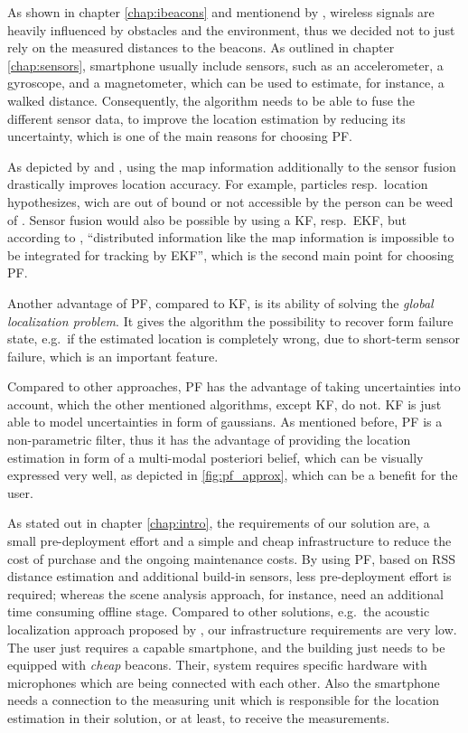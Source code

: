 As shown in chapter \ref{chap:ibeacons} and mentionend by \citet{IEEE:survey_wireless_indoor_pos}, wireless signals are heavily influenced by obstacles and the environment, thus we decided not to just rely on the measured distances to the beacons. As outlined in chapter \ref{chap:sensors}, smartphone usually include sensors, such as an accelerometer, a gyroscope, and a magnetometer, which can be used to estimate, for instance, a walked distance. Consequently, the algorithm needs to be able to fuse the different sensor data, to improve the location estimation by reducing its uncertainty, which is one of the main reasons for choosing \acs{PF}.

As depicted by \citet{siddiqi:experiments_mcl_wifi} and \citet{wang:wlan}, using the map information additionally to the sensor fusion drastically improves location accuracy. For example, particles resp.\ location hypothesizes, wich are out of bound or not accessible by the person can be weed of \citep{straub:pf,siddiqi:experiments_mcl_wifi}. Sensor fusion would also be possible by using a \acl{KF}, resp.\ \acs{EKF}, but according to \citet{wang:wlan}, ``distributed information like the map information is impossible to be integrated for tracking by \acs{EKF}'', which is the second main point for choosing \acs{PF}.

Another advantage of \acs{PF}, compared to \acs{KF}, is its ability of solving the \emph{global localization problem}. It gives the algorithm the possibility to recover form failure state, e.g.\ if the estimated location is completely wrong, due to short-term sensor failure, which is an important feature.

Compared to other approaches, \acs{PF} has the advantage of taking uncertainties into account, which the other mentioned algorithms, except \acs{KF}, do not. \acs{KF} is just able to model uncertainties in form of gaussians. As mentioned before, \acs{PF} is a non-parametric filter, thus it has the advantage of providing the location estimation in form of a multi-modal posteriori belief, which can be visually expressed very well, as depicted in \ref{fig:pf_approx}, which can be a benefit for the user.

As stated out in chapter \ref{chap:intro}, the requirements of our solution are, a small pre-deployment effort and a simple and cheap infrastructure to reduce the cost of purchase and the ongoing maintenance costs. By using \acs{PF}, based on \acs{RSS} distance estimation and additional build-in sensors, less pre-deployment effort is required; whereas the scene analysis approach, for instance, need an additional time consuming offline stage. Compared to other solutions, e.g.\ the acoustic localization approach proposed by \citet{hoflinger:acoustic}, our infrastructure requirements are very low. The user just requires a capable smartphone, and the building just needs to be equipped with \emph{cheap} beacons. Their, system requires specific hardware with microphones which are being connected with each other. Also the smartphone needs a connection to the measuring unit which is responsible for the location estimation in their solution, or at least, to receive the measurements.

